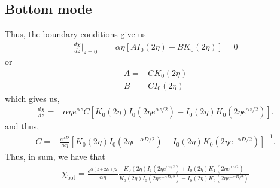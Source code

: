 \documentclass[11pt]{article}
\begin{document}
\subsection{Bottom mode}
Thus, the boundary conditions give us
\begin{align}
\frac{d\chi}{dz} \biggr\rvert_{z=0} =&  \alpha \eta  \left[ A I_0(2 \eta) - B K_0(2 \eta) \right] = 0
\end{align}
or
\begin{align}
A =& C K_0(2 \eta) \\
B =& C I_0(2 \eta) 
\end{align}
which gives us,
\begin{align}
\frac{d\chi}{dz}=& \alpha   \eta e^{\alpha z} C \left[ K_0(2 \eta) I_0 \left( 2 \eta e^{\alpha z/2} \right) - I_0(2 \eta)  K_0 \left( 2 \eta e^{\alpha z/2} \right)  \right].
\end{align}
and thus,
\begin{align}
C=& \frac{e^{\alpha D}}{\alpha  \eta}  \left[ K_0(2 \eta) I_0 \left( 2 \eta e^{-\alpha D/2} \right) - I_0(2 \eta)  K_0 \left( 2 \eta e^{-\alpha D/2} \right)  \right]^{-1}.
\end{align}
Thus, in sum, we have that
\begin{align}
\chi_{\textrm{bot}} =  \frac{e^{\alpha (z+2 D)/2}}{\alpha \eta} \frac{K_0(2 \eta)  I_1 \left( 2 \eta e^{\alpha z/2} \right) + I_0(2 \eta)  K_1 \left( 2 \eta e^{\alpha z/2}  \right)}{K_0(2 \eta) I_0 \left( 2 \eta e^{-\alpha D/2} \right) - I_0(2 \eta)  K_0 \left( 2 \eta e^{-\alpha D/2} \right)}
\end{align}
\end{document}
